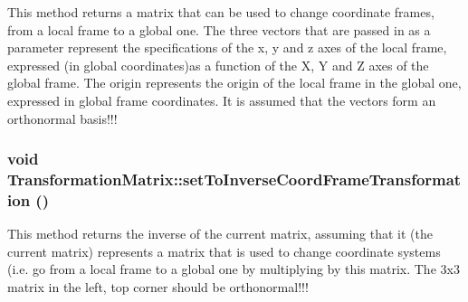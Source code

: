 This method returns a matrix that can be used to change coordinate frames, from a local frame to a global one. The three vectors that are passed in as a parameter represent the specifications of the x, y and z axes of the local frame, expressed (in global coordinates)as a function of the X, Y and Z axes of the global frame. The origin represents the origin of the local frame in the global one, expressed in global frame coordinates. It is assumed that the vectors form an orthonormal basis!!! \hypertarget{classCartWheel_1_1Math_1_1TransformationMatrix_a31e8038d6078dadafdf38211f42737aa}{
\subsubsection[{setToInverseCoordFrameTransformation}]{\setlength{\rightskip}{0pt plus 5cm}void TransformationMatrix::setToInverseCoordFrameTransformation ()}}
\label{classCartWheel_1_1Math_1_1TransformationMatrix_a31e8038d6078dadafdf38211f42737aa}
This method returns the inverse of the current matrix, assuming that it (the current matrix) represents a matrix that is used to change coordinate systems (i.e. go from a local frame to a global one by multiplying by this matrix. The 3x3 matrix in the left, top corner should be orthonormal!!!


